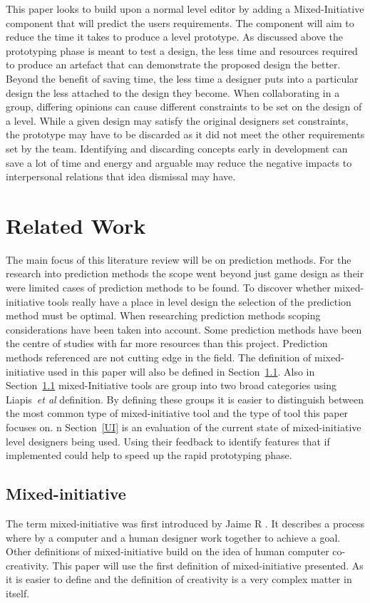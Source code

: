 \documentclass[journal]{IEEEtran}
\begin{document}
This paper looks to build upon  a normal level editor by adding a Mixed-Initiative component that will predict the users requirements. The component will aim to reduce the time it takes to produce a level prototype. As discussed above the prototyping phase is meant to test a design, the less time and resources required to produce an artefact that can demonstrate the proposed design the better. Beyond the benefit of saving time, the less time a designer puts into a particular design the less attached to the design they become. When collaborating in a group, differing opinions can cause different constraints to be set on the design of a level. While a given design may satisfy the original designers set constraints, the prototype may have to be discarded as it did not meet the other requirements set by the team. Identifying and discarding concepts early in development can save a lot of time and energy \cite[p.489]{stempfle1999thinking} and arguable may reduce the negative impacts to interpersonal relations that idea dismissal may have. 

\section{Related Work}
The main focus of this literature review will be on prediction methods. For the research into prediction methods the scope went beyond just game design as their were limited cases of prediction methods to be found. To discover whether mixed-initiative tools really have a place in level design the selection of the prediction method must be optimal. When researching prediction methods scoping considerations have been taken into account. Some prediction methods have been the centre of studies with far more resources than this project. Prediction methods referenced are not cutting edge in the field.  The definition of mixed-initiative used in this paper will also be defined in  Section~\ref{MI}.  Also in Section~\ref{MI} mixed-Initiative tools are group into two broad categories using Liapis~\textit{et al}\cite{liapis2016mixed} definition. By defining these groups it is easier to distinguish between the most common type of mixed-initiative tool and the type of tool this paper focuses on.  n Section~\ref{UI} is an evaluation of the current state of mixed-initiative level designers being used. Using their feedback to identify features that if implemented could help to speed up the rapid prototyping phase. 

\subsection{Mixed-initiative} \label{MI}
The term mixed-initiative was first introduced by Jaime R \cite{carbonell1970mixed}.
It describes a process where by a computer and a human designer work together to achieve a goal. Other definitions of mixed-initiative build on the idea of human computer co-creativity. This paper will use the first definition of mixed-initiative presented. As it is easier to define and the definition of creativity is a very complex matter in itself. 
\end{document}
